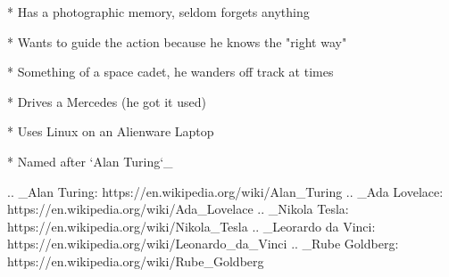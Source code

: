     * Has a photographic memory, seldom forgets anything

    * Wants to guide the action because he knows the "right way"

    * Something of a space cadet, he wanders off track at times

    * Drives a Mercedes (he got it used)

    * Uses Linux on an Alienware Laptop

    * Named after `Alan Turing`_

..  _Alan Turing:    https://en.wikipedia.org/wiki/Alan_Turing
..  _Ada Lovelace: https://en.wikipedia.org/wiki/Ada_Lovelace
..  _Nikola Tesla: https://en.wikipedia.org/wiki/Nikola_Tesla
..  _Leorardo da Vinci: https://en.wikipedia.org/wiki/Leonardo_da_Vinci
..  _Rube Goldberg: https://en.wikipedia.org/wiki/Rube_Goldberg
